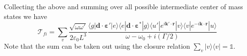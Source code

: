 \documentclass[11pt,letter]{article}
\newcommand{\bv}[1]{\ensuremath{\bm{#1}}}
\begin{document}
Collecting the above and summing over all possible intermediate center of mass
states we have 
\begin{equation}
    \mathcal{T}_{fi} = \sum_{v} \frac{\sqrt{\omega \omega'}}
                                     {2\varepsilon_{0} L^{3}}
    \frac{ 
      \langle g | \bv{d} \cdot \bv{\varepsilon}' | e \rangle 
      \langle e | \bv{d} \cdot \bv{\varepsilon}^{*} | g \rangle 
      \langle u'| e^{i\bv{k}'\cdot\bv{r}} | v \rangle 
      \langle v | e^{-i\bv{k}\cdot\bv{r}} | u  \rangle
       }
        { \omega - \omega_{0} + i (\Gamma/2 ) }
\label{eq:tfi} 
\end{equation}
Note that the sum can be taken out using the closure relation
$\sum_{v}|v\rangle\langle v| = \mathbb{1}$. 
\end{document}
